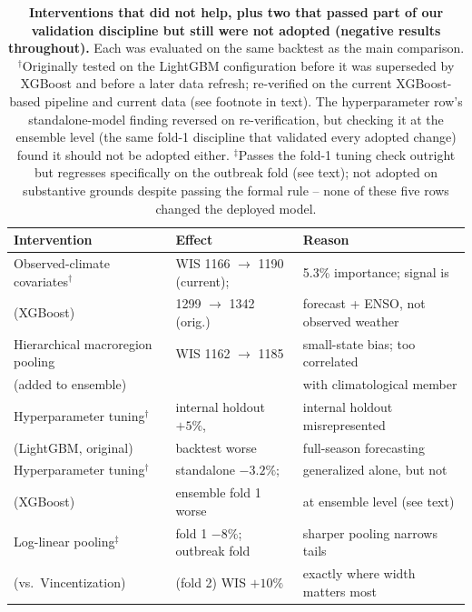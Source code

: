 \documentclass[11pt]{article}
\begin{document}
\begin{table}[t]
\centering\small
\caption{\textbf{Interventions that did not help, plus two that passed part of our validation
discipline but still were not adopted (negative results throughout).} Each was evaluated on
the same backtest as the main comparison. $^{\dagger}$Originally tested on the LightGBM
configuration before it was superseded by XGBoost and before a later data refresh; re-verified on
the current XGBoost-based pipeline and current data (see footnote in text). The hyperparameter
row's standalone-model finding reversed on re-verification, but checking it at the ensemble level
(the same fold-1 discipline that validated every adopted change) found it should not be adopted
either. $^{\ddagger}$Passes the fold-1 tuning check outright but regresses specifically on the
outbreak fold (see text); not adopted on substantive grounds despite passing the formal rule --
none of these five rows changed the deployed model.}
\label{tab:ablation}
\begin{tabular}{@{}lll@{}}
\toprule
\textbf{Intervention} & \textbf{Effect} & \textbf{Reason} \\
\midrule
Observed-climate covariates$^{\dagger}$ & WIS 1166 $\rightarrow$ 1190 (current); & 5.3\% importance; signal is \\
 (XGBoost) & 1299 $\rightarrow$ 1342 (orig.) & forecast + ENSO, not observed weather \\
Hierarchical macroregion pooling & WIS 1162 $\rightarrow$ 1185 & small-state bias; too correlated \\
 (added to ensemble) & & with climatological member \\
Hyperparameter tuning$^{\dagger}$ & internal holdout $+5\%$, & internal holdout misrepresented \\
 (LightGBM, original) & backtest worse & full-season forecasting \\
Hyperparameter tuning$^{\dagger}$ & standalone $-3.2\%$; & generalized alone, but not \\
 (XGBoost) & ensemble fold 1 worse & at ensemble level (see text) \\
Log-linear pooling$^{\ddagger}$ & fold 1 $-8\%$; outbreak fold & sharper pooling narrows tails \\
 (vs.\ Vincentization) & (fold 2) WIS $+10\%$ & exactly where width matters most \\
\bottomrule
\end{tabular}
\end{table}
\end{document}
